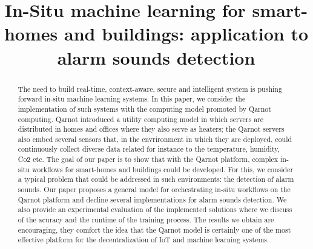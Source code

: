 \documentclass[10pt, conference, compsocconf]{IEEEtran}
\begin{document}
%
\title{In-Situ machine learning for smart-homes and buildings: application to alarm sounds detection}



\author{
\and
{}
\and
{}
}

\maketitle


\begin{abstract}
The need to build real-time, context-aware, secure and intelligent system is pushing forward in-situ machine learning systems. 
In this paper, we consider the implementation of such systems with the computing model promoted by 
Qarnot computing. Qarnot introduced a utility computing model in which servers are distributed in homes and offices where they also 
serve as heaters; the Qarnot servers also embed several sensors that, in the envrironment in which they are deployed, could continuously 
collect diverse data related for instance to the temperature, humidity, Co2 etc. The goal of our paper is to show that with the Qarnot 
platform, complex in-situ workflows for smart-homes and buildings could be developed. For this, we consider a typical problem that could be addressed in such environments: the detection of alarm sounds. Our paper proposes a general model for 
orchestrating in-situ workflows on 
the Qarnot platform and decline several implementations for alarm sounds detection. 
We also provide an experimental evaluation of the implemented solutions where we 
discuss of the acuracy and the runtime of the training process. The results we obtain are encouraging, they comfort the idea that the Qarnot
 model is certainly one of the most effective platform for the decentralization of IoT and machine learning systems. 
\end{abstract}
\end{document}
